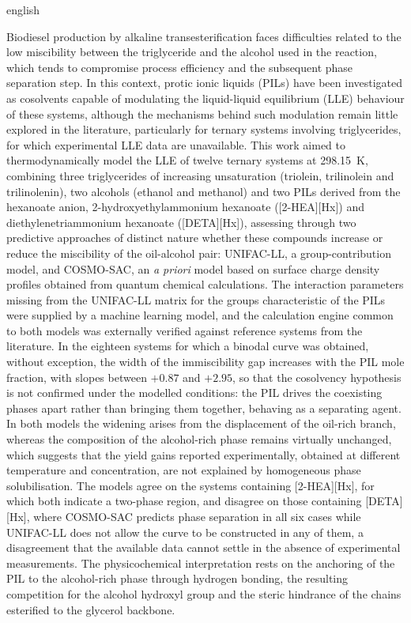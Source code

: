 \begin{resumo}[Abstract]
\begin{otherlanguage*}{english}
 
Biodiesel production by alkaline transesterification faces difficulties related to the low miscibility between the triglyceride and the alcohol used in the reaction, which tends to compromise process efficiency and the subsequent phase separation step. In this context, protic ionic liquids (PILs) have been investigated as cosolvents capable of modulating the liquid-liquid equilibrium (LLE) behaviour of these systems, although the mechanisms behind such modulation remain little explored in the literature, particularly for ternary systems involving triglycerides, for which experimental LLE data are unavailable. This work aimed to thermodynamically model the LLE of twelve ternary systems at 298.15~K, combining three triglycerides of increasing unsaturation (triolein, trilinolein and trilinolenin), two alcohols (ethanol and methanol) and two PILs derived from the hexanoate anion, 2-hydroxyethylammonium hexanoate ([2-HEA][Hx]) and diethylenetriammonium hexanoate ([DETA][Hx]), assessing through two predictive approaches of distinct nature whether these compounds increase or reduce the miscibility of the oil-alcohol pair: UNIFAC-LL, a group-contribution model, and COSMO-SAC, an \textit{a priori} model based on surface charge density profiles obtained from quantum chemical calculations. The interaction parameters missing from the UNIFAC-LL matrix for the groups characteristic of the PILs were supplied by a machine learning model, and the calculation engine common to both models was externally verified against reference systems from the literature. In the eighteen systems for which a binodal curve was obtained, without exception, the width of the immiscibility gap increases with the PIL mole fraction, with slopes between $+0.87$ and $+2.95$, so that the cosolvency hypothesis is not confirmed under the modelled conditions: the PIL drives the coexisting phases apart rather than bringing them together, behaving as a separating agent. In both models the widening arises from the displacement of the oil-rich branch, whereas the composition of the alcohol-rich phase remains virtually unchanged, which suggests that the yield gains reported experimentally, obtained at different temperature and concentration, are not explained by homogeneous phase solubilisation. The models agree on the systems containing [2-HEA][Hx], for which both indicate a two-phase region, and disagree on those containing [DETA][Hx], where COSMO-SAC predicts phase separation in all six cases while UNIFAC-LL does not allow the curve to be constructed in any of them, a disagreement that the available data cannot settle in the absence of experimental measurements. The physicochemical interpretation rests on the anchoring of the PIL to the alcohol-rich phase through hydrogen bonding, the resulting competition for the alcohol hydroxyl group and the steric hindrance of the chains esterified to the glycerol backbone.
 

\end{otherlanguage*}
\end{resumo}
